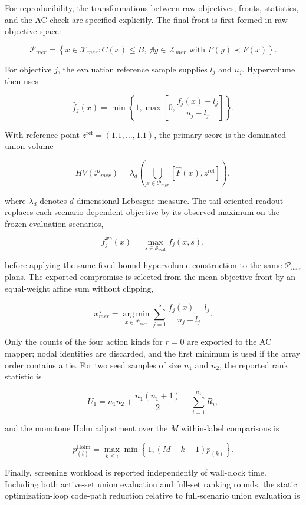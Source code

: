 \documentclass[energies,article,submit,moreauthors]{Definitions/mdpi}
\begin{document}
For reproducibility, the transformations between raw objectives, fronts, statistics, and the AC check are specified explicitly. The final front is first formed in raw objective space:

\[
\mathcal{P}_{mer}=\left\{x\in\mathcal{X}_{mer}:C(x)\leq B,\ \nexists y\in\mathcal{X}_{mer}\text{ with }F(y)\prec F(x)\right\}.
\]

For objective \(j\), the evaluation reference sample supplies \(l_j\) and \(u_j\). Hypervolume then uses

\[
\widehat f_j(x)=\min\!\left\{1,\max\!\left[0,\frac{f_j(x)-l_j}{u_j-l_j}\right]\right\}.
\]

With reference point \(z^{\mathrm{ref}}=(1.1,\ldots,1.1)\), the primary score is the dominated union volume

\[
HV(\mathcal{P}_{mer})=\lambda_d\!\left(\bigcup_{x\in\mathcal{P}_{mer}}[\widehat F(x),z^{\mathrm{ref}}]\right),
\]

where \(\lambda_d\) denotes \(d\)-dimensional Lebesgue measure. The tail-oriented readout replaces each scenario-dependent objective by its observed maximum on the frozen evaluation scenarios,

\[
f_j^{\mathrm{wc}}(x)=\max_{s\in\mathcal{S}_{\mathrm{eval}}}f_j(x,s),
\]

before applying the same fixed-bound hypervolume construction to the same \(\mathcal P_{mer}\) plans. The exported compromise is selected from the mean-objective front by an equal-weight affine sum without clipping,

\[
x_{mer}^{\star}=\operatorname*{arg\,min}_{x\in\mathcal P_{mer}}
\sum_{j=1}^{5}\frac{f_j(x)-l_j}{u_j-l_j}.
\]

Only the counts of the four action kinds for \(r=0\) are exported to the AC mapper; nodal identities are discarded, and the first minimum is used if the array order contains a tie. For two seed samples of size \(n_1\) and \(n_2\), the reported rank statistic is

\[
U_1=n_1n_2+\frac{n_1(n_1+1)}{2}-\sum_{i=1}^{n_1}R_i,
\]

and the monotone Holm adjustment over the \(M\) within-label comparisons is

\[
p^{\mathrm{Holm}}_{(i)}=\max_{k\leq i}\min\!\left\{1,(M-k+1)p_{(k)}\right\}.
\]

Finally, screening workload is reported independently of wall-clock time. Including both active-set union evaluation and full-set ranking rounds, the static optimization-loop code-path reduction relative to full-scenario union evaluation is
\end{document}
